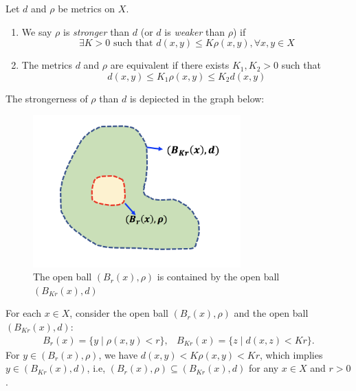 \begin{definition}
Let $d$ and $\rho$ be metrics on $X$. 
\begin{enumerate}
\item
We say $\rho$ is \emph{stronger} than $d$ (or $d$ is \emph{weaker} than $\rho$) if
\[
\exists K>0\mbox{ such that }d(x,y)\le K\rho(x,y),\forall x,y\in X
\]
\item
The metrics $d$ and $\rho$ are equivalent if there exists $K_1,K_2>0$ such that
\[
d(x,y)\le K_1\rho(x,y)\le K_2d(x,y)
\]
\end{enumerate}
\end{definition}
\begin{remark}
The strongerness of $\rho$ than $d$ is depiected in the graph below:
\begin{figure}[H]
\centering
\includegraphics[width=8cm]{week1/f_3_1}
\caption{The open ball $(B_r(x),\rho)$ is contained by the open ball $(B_{Kr}(x),d)$}
\end{figure}
For each $x\in X$, consider the open ball $(B_r(x),\rho)$ and the open ball $(B_{Kr}(x),d)$:
\[
\begin{array}{ll}
B_r(x)=\{y\mid \rho(x,y)<r\},
&
B_{Kr}(x)=\{z\mid d(x,z)<Kr\}.
\end{array}
\]
For $y\in (B_r(x),\rho)$, we have $d(x,y)<K\rho(x,y)<Kr$, which implies $y\in (B_{Kr}(x),d)$, i.e, $(B_r(x),\rho)\subseteq (B_{Kr}(x),d)$ for any $x\in X$ and $r>0$.

\end{remark}
